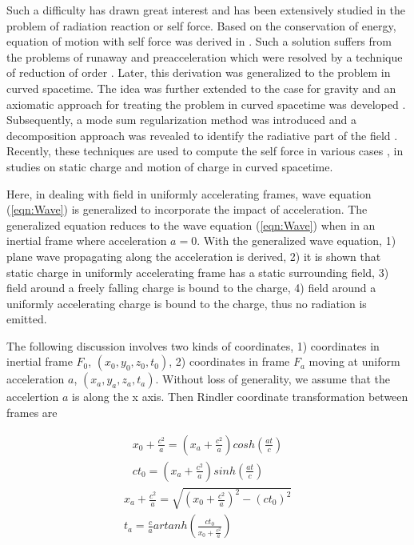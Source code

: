 \documentclass[prd,showpacs,preprint]{revtex4-1}
\begin{document}
Such a difficulty has drawn great interest and has been extensively studied in the problem of radiation reaction or self force. Based on the conservation of energy, equation of motion with self force was derived in \cite{Dirac}. Such a solution suffers from the problems of runaway and preacceleration which were resolved by a technique of reduction of order \cite{Landau}. Later, this derivation was generalized to the problem in curved spacetime\cite{DeWitt}. The idea was further extended to the case for gravity \cite{Mino} and an axiomatic approach for treating the problem in curved spacetime was developed \cite{Quinn}. Subsequently, a mode sum regularization method was introduced \cite{Barack} and a decomposition approach was revealed to identify the radiative part of the field \cite{Detweiler}. Recently, these techniques are used to compute the self force in various cases \cite{Wiseman,Quinn1,Pfenning,Haas,Drasco,Haas1,Shankar,Pound}, in studies on static charge and motion of charge in curved spacetime.

Here, in dealing with field in uniformly accelerating frames, wave equation (\ref{eqn:Wave}) is generalized to incorporate the impact of acceleration. The generalized equation reduces to the wave equation (\ref{eqn:Wave}) when in an inertial frame where acceleration $a=0$. With the generalized wave equation, 1) plane wave propagating along the acceleration is derived, 2) it is shown that static charge in uniformly accelerating frame has a static surrounding field, 3) field around a freely falling charge is bound to the charge, 4) field around a uniformly accelerating charge is bound to the charge, thus no radiation is emitted.

The following discussion involves two kinds of coordinates, 1) coordinates in inertial frame $F_0$,  $(x_0,y_0,z_0,t_0)$, 2) coordinates in frame $F_a$ moving at uniform acceleration $a$, $(x_a,y_a,z_a,t_a)$. Without loss of generality, we assume that the accelertion $a$ is along the x axis. Then Rindler coordinate transformation between frames are

\begin{eqnarray}
x_0+\frac{c^2}{a}=(x_a+\frac{c^2}{a})cosh(\frac{at}{c})\nonumber\\
ct_0=(x_a+\frac{c^2}{a})sinh(\frac{at}{c})
\label{eqn:coordinates0}
\end{eqnarray}
\begin{eqnarray}
x_a+\frac{c^2}{a}=\sqrt{(x_0+\frac{c^2}{a})^2-(ct_0)^2}\nonumber\\
t_a=\frac{c}{a}artanh(\frac{ct_0}{x_0+\frac{c^2}{a}})
\label{eqn:coordinates1}
\end{eqnarray}
\end{document}
